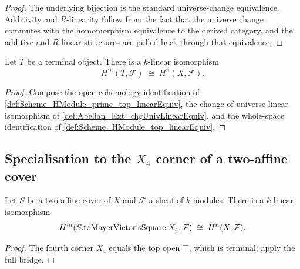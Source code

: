 \begin{proof}

\leanok
  The underlying bijection is the standard universe-change equivalence. Additivity and \(R\)-linearity follow from the fact that the universe change commutes with the homomorphism equivalence to the derived category, and the additive and \(R\)-linear structures are pulled back through that equivalence.
\end{proof}

\begin{definition}\leanok
  \label{def:Scheme_HModule_prime_eq_HModule_linearEquiv}

  Let \(T\) be a terminal object. There is a \(k\)-linear isomorphism
  \[
    H^{\prime n}(T, \mathcal F) \;\cong\; H^{n}(X, \mathcal F).
  \]
\end{definition}

\begin{proof}


\leanok
  Compose the open-cohomology identification of \cref{def:Scheme_HModule_prime_top_linearEquiv}, the change-of-universe linear isomorphism of \cref{def:Abelian_Ext_chgUnivLinearEquiv}, and the whole-space identification of \cref{def:Scheme_HModule_top_linearEquiv}.
\end{proof}

\subsection{Specialisation to the \(X_4\) corner of a two-affine cover}

\begin{definition}\leanok
  \label{def:Scheme_AffineCoverMVSquare_HModule_prime_X4_linearEquiv}

  Let \(S\) be a two-affine cover of \(X\) and \(\mathcal F\) a sheaf of \(k\)-modules. There is a \(k\)-linear isomorphism
  \[
    H^{\prime n}(S.\mathrm{toMayerVietorisSquare}.X_4, \mathcal F) \;\cong\; H^{n}(X, \mathcal F).
  \]
\end{definition}

\begin{proof}


\leanok
  The fourth corner \(X_4\) equals the top open \(\top\), which is terminal; apply the full bridge.
\end{proof}

